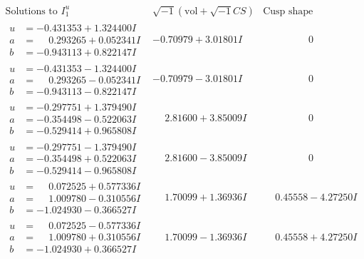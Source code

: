 \documentclass[1p]{elsarticle_modified}
\theoremstyle{definition}
\newcommand{\I}{\sqrt{-1}}
\begin{document}
$$\begin{array}{c|c|c}
 \end{array}$$\newpage$$\begin{array}{c|c|c}  
\text{Solutions to }I^u_{1}& \I (\text{vol} + \sqrt{-1}CS) & \text{Cusp shape}\\
 \hline 
\begin{aligned}
u &= -0.431353 + 1.324400 I \\
a &= \phantom{-}0.293265 + 0.052341 I \\
b &= -0.943113 + 0.822147 I\end{aligned}
 & -0.70979 + 3.01801 I & \phantom{-0.000000 } 0 \\ \hline\begin{aligned}
u &= -0.431353 - 1.324400 I \\
a &= \phantom{-}0.293265 - 0.052341 I \\
b &= -0.943113 - 0.822147 I\end{aligned}
 & -0.70979 - 3.01801 I & \phantom{-0.000000 } 0 \\ \hline\begin{aligned}
u &= -0.297751 + 1.379490 I \\
a &= -0.354498 - 0.522063 I \\
b &= -0.529414 + 0.965808 I\end{aligned}
 & \phantom{-}2.81600 + 3.85009 I & \phantom{-0.000000 } 0 \\ \hline\begin{aligned}
u &= -0.297751 - 1.379490 I \\
a &= -0.354498 + 0.522063 I \\
b &= -0.529414 - 0.965808 I\end{aligned}
 & \phantom{-}2.81600 - 3.85009 I & \phantom{-0.000000 } 0 \\ \hline\begin{aligned}
u &= \phantom{-}0.072525 + 0.577336 I \\
a &= \phantom{-}1.009780 - 0.310556 I \\
b &= -1.024930 - 0.366527 I\end{aligned}
 & \phantom{-}1.70099 + 1.36936 I & \phantom{-}0.45558 - 4.27250 I \\ \hline\begin{aligned}
u &= \phantom{-}0.072525 - 0.577336 I \\
a &= \phantom{-}1.009780 + 0.310556 I \\
b &= -1.024930 + 0.366527 I\end{aligned}
 & \phantom{-}1.70099 - 1.36936 I & \phantom{-}0.45558 + 4.27250 I \\ \hline\begin{aligned}

\end{aligned}
\end{array}$$
\end{document}
